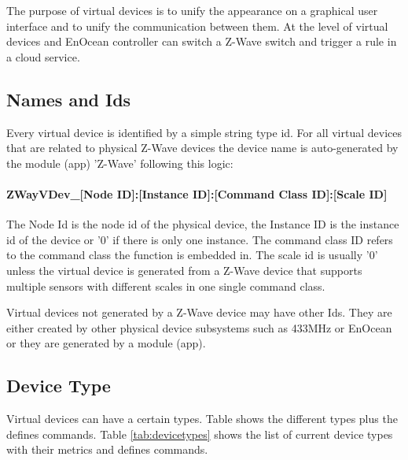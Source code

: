 The purpose of virtual devices is to unify the appearance on a graphical user interface 
and to unify the communication between them. At the level of virtual devices 
and EnOcean controller can switch a Z-Wave switch and trigger a rule in a cloud 
service.
 
\subsection{Names and Ids}

Every virtual device is identified by a simple string type id. For all virtual devices 
that are related to physical Z-Wave devices the device name is auto-generated by the 
module (app) 'Z-Wave' following this logic:

\paragraph{ZWayVDev\_[Node ID]:[Instance ID]:[Command Class ID]:[Scale ID]}

The Node Id is the node id of the physical device, the Instance ID is the instance id 
of the device  or '0' if there is only one instance. The command class ID refers to the 
command class the function is embedded in. The scale id is usually '0' unless the virtual
device is generated from a Z-Wave device that supports multiple sensors with different 
scales in one single command class.

Virtual devices not generated by a Z-Wave device may have other Ids. They are either created 
by other physical device subsystems such as 433MHz or EnOcean or they are generated
by a module (app).

\subsection{Device Type}

Virtual devices can have a certain types. Table shows the different types plus the defines 
commands.  Table \ref{tab:devicetypes} shows the list of current device types with their 
metrics and defines commands.

